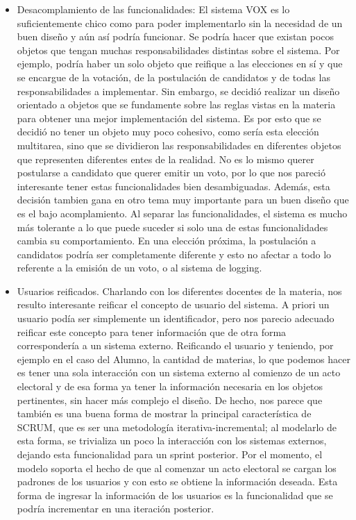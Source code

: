 \begin{itemize}
\item Desacomplamiento de las funcionalidades: El sistema VOX es lo suficientemente chico como para poder implementarlo sin la necesidad de un buen diseño y a\'un as\'i podr\'ia funcionar. Se podr\'ia hacer que existan pocos objetos que tengan muchas responsabilidades distintas sobre el sistema. Por ejemplo, podr\'ia haber un solo objeto que reifique a las elecciones en s\'i y que se encargue de la votaci\'on, de la postulaci\'on de candidatos y de todas las responsabilidades a implementar. Sin embargo, se decidi\'o realizar un dise\~{n}o orientado a objetos que se fundamente sobre las reglas vistas en la materia para obtener una mejor implementaci\'on del sistema. Es por esto que se decidi\'o no tener un objeto muy poco cohesivo, como ser\'ia esta elecci\'on multitarea, sino que se dividieron las responsabilidades en diferentes objetos que representen diferentes entes de la realidad. No es lo mismo querer postularse a candidato que querer emitir un voto, por lo que nos pareci\'o interesante tener estas funcionalidades bien desambiguadas. Adem\'as, esta decisi\'on tambien gana en otro tema muy importante para un buen diseño que es el bajo acomplamiento. Al separar las funcionalidades, el sistema es mucho m\'as tolerante a lo que puede suceder si solo una de estas funcionalidades cambia su comportamiento. En una elecci\'on pr\'oxima, la postulaci\'on a candidatos podr\'ia ser completamente diferente y esto no afectar a todo lo referente a la emisi\'on de un voto, o al sistema de logging.

\item Usuarios reificados. Charlando con los diferentes docentes de la materia, nos resulto interesante reificar el concepto de usuario del sistema. A priori un usuario pod\'ia ser simplemente un identificador, pero nos parecio adecuado reificar este concepto para tener informaci\'on que de otra forma corresponder\'ia a un sistema externo. Reificando el usuario y teniendo, por ejemplo en el caso del Alumno, la cantidad de materias, lo que podemos hacer es tener una sola interacci\'on con un sistema externo al comienzo de un acto electoral y de esa forma ya tener la informaci\'on necesaria en los objetos pertinentes, sin hacer m\'as complejo el dise\~{n}o. De hecho, nos parece que tambi\'en es una buena forma de mostrar la principal caracter\'istica de SCRUM, que es ser una metodolog\'ia iterativa-incremental; al modelarlo de esta forma, se trivializa un poco la interacci\'on con los sistemas externos, dejando esta funcionalidad para un sprint posterior. Por el momento, el modelo soporta el hecho de que al comenzar un acto electoral se cargan los padrones de los usuarios y con esto se obtiene la informaci\'on deseada. Esta forma de ingresar la informaci\'on de los usuarios es la funcionalidad que se podr\'ia incrementar en una iteraci\'on posterior.




\end{itemize}
